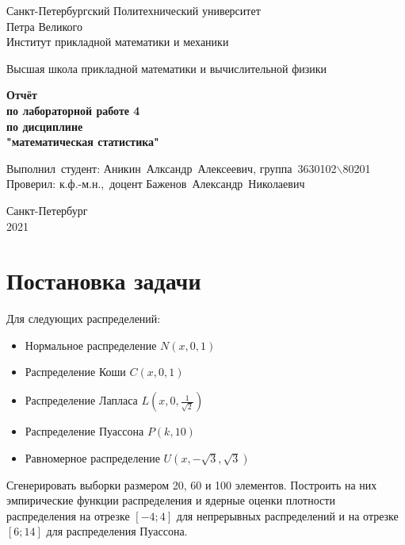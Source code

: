 \documentclass[12pt,a4paper]{article}
\begin{document}
	
	\begin{titlepage}
		
		\begin{center}
			\begin{large}
				Санкт-Петербургский Политехнический университет\\ Петра Великого\\
				Институт прикладной математики и механики\\
			\end{large}
			\vspace{0.2cm}
			Высшая школа прикладной математики и вычислительной физики\\
			
		\end{center}
		
		\vspace{3cm}
		\begin{center}
			\textbf{Отчёт\\ по лабораторной работе 4\\ по дисциплине\\ "математическая статистика"}
		\end{center}
		
		\vspace{3cm}
		\vbox{%
			\hfill%
			\vbox{%
				\hbox{Выполнил студент:}%
				\hbox{\break}
				\hbox{Аникин Алксандр Алексеевич,}%
				\hbox{группа 3630102$\backslash$80201}%
				\hbox{\break}
				\hbox{\break}
				\hbox{Проверил:}
				\hbox{\break}
				\hbox{к.ф.-м.н., доцент}
				\hbox{Баженов Александр Николаевич}
			}%
		} 
		\vfill
		
		\begin{center}
			Санкт-Петербург\\2021
		\end{center}
		
	\end{titlepage}
	\tableofcontents
	\newpage
	
	\listoffigures
	\newpage
	
	\listoftables
	\newpage	
	
	\section{Постановка задачи}
	Для следующих распределений:
	\begin{itemize}
		\item Нормальное распределение $\textit{N}(\textit{x}, 0, 1)$
		\item Распределение Коши $\textit{C}(\textit{x}, 0, 1)$
		\item Распределение Лапласа $\textit{L}(\textit{x}, 0, \frac{1}{\sqrt{2}})$
		\item Распределение Пуассона $\textit{P}(\textit{k}, 10)$
		\item Равномерное распределение $\textit{U}(\textit{x}, -\sqrt{3}, \sqrt{3})$
	\end{itemize}
	Сгенерировать выборки размером 20, 60 и 100 элементов.
	Построить на них эмпирические функции распределения и ядерные
	оценки плотности распределения на отрезке $[-4; 4]$ для непрерывных
	распределений и на отрезке $[6; 14]$ для распределения Пуассона.
	
\end{document}
